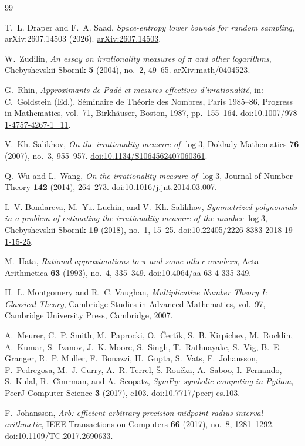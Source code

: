 \documentclass[preprint,12pt]{elsarticle}
\theoremstyle{definition}
\begin{document}
\begin{thebibliography}{99}

T.~L. Draper and F.~A. Saad,
\emph{Space-entropy lower bounds for random sampling},
arXiv:2607.14503 (2026).
\href{https://arxiv.org/abs/2607.14503}{arXiv:2607.14503}.

W.~Zudilin,
\emph{An essay on irrationality measures of $\pi$ and other logarithms},
Chebyshevskii Sbornik \textbf{5} (2004), no.~2, 49--65.
\href{https://arxiv.org/abs/math/0404523}{arXiv:math/0404523}.

G.~Rhin,
\emph{Approximants de Pad\'e et mesures effectives d'irrationalit\'e},
in: C.~Goldstein (Ed.), S\'eminaire de Th\'eorie des Nombres,
Paris 1985--86, Progress in Mathematics, vol.~71,
Birkh\"auser, Boston, 1987, pp.~155--164.
\href{https://doi.org/10.1007/978-1-4757-4267-1_11}
{doi:10.1007/978-1-4757-4267-1\_11}.

V.~Kh. Salikhov,
\emph{On the irrationality measure of $\log3$},
Doklady Mathematics \textbf{76} (2007), no.~3, 955--957.
\href{https://doi.org/10.1134/S1064562407060361}
{doi:10.1134/S1064562407060361}.

Q.~Wu and L.~Wang,
\emph{On the irrationality measure of $\log3$},
Journal of Number Theory \textbf{142} (2014), 264--273.
\href{https://doi.org/10.1016/j.jnt.2014.03.007}
{doi:10.1016/j.jnt.2014.03.007}.

I.~V. Bondareva, M.~Yu. Luchin, and V.~Kh. Salikhov,
\emph{Symmetrized polynomials in a problem of estimating the irrationality
measure of the number $\log3$},
Chebyshevskii Sbornik \textbf{19} (2018), no.~1, 15--25.
\href{https://doi.org/10.22405/2226-8383-2018-19-1-15-25}
{doi:10.22405/2226-8383-2018-19-1-15-25}.

M.~Hata,
\emph{Rational approximations to $\pi$ and some other numbers},
Acta Arithmetica \textbf{63} (1993), no.~4, 335--349.
\href{https://doi.org/10.4064/aa-63-4-335-349}
{doi:10.4064/aa-63-4-335-349}.

H.~L. Montgomery and R.~C. Vaughan,
\emph{Multiplicative Number Theory I: Classical Theory},
Cambridge Studies in Advanced Mathematics, vol.~97,
Cambridge University Press, Cambridge, 2007.

A.~Meurer, C.~P. Smith, M.~Paprocki, O.~\v{C}ert\'{\i}k,
S.~B. Kirpichev, M.~Rocklin, A.~Kumar, S.~Ivanov, J.~K. Moore,
S.~Singh, T.~Rathnayake, S.~Vig, B.~E. Granger, R.~P. Muller,
F.~Bonazzi, H.~Gupta, S.~Vats, F.~Johansson, F.~Pedregosa,
M.~J. Curry, A.~R. Terrel, \v{S}. Rou\v{c}ka, A.~Saboo,
I.~Fernando, S.~Kulal, R.~Cimrman, and A.~Scopatz,
\emph{SymPy: symbolic computing in Python},
PeerJ Computer Science \textbf{3} (2017), e103.
\href{https://doi.org/10.7717/peerj-cs.103}
{doi:10.7717/peerj-cs.103}.

F.~Johansson,
\emph{Arb: efficient arbitrary-precision midpoint-radius interval
arithmetic},
IEEE Transactions on Computers \textbf{66} (2017), no.~8, 1281--1292.
\href{https://doi.org/10.1109/TC.2017.2690633}
{doi:10.1109/TC.2017.2690633}.

\end{thebibliography}
\end{document}
